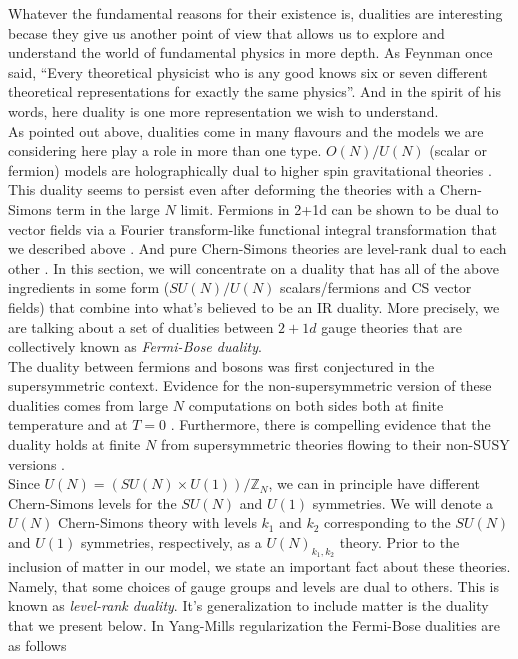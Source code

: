         Whatever the fundamental reasons for their existence is, dualities are interesting becase they give us another point of view that allows us to explore and understand the world of fundamental physics in more depth. As Feynman once said, ``Every theoretical physicist who is any good knows six or seven different theoretical representations for exactly the same physics''\cite{Feynman_quote}. And in the spirit of his words, here duality is one more representation we wish to understand.\\
        \indent As pointed out above, dualities come in many flavours and the models we are considering here play a role in more than one type. $O(N)/U(N)$ (scalar or fermion) models are holographically dual to higher spin gravitational theories \cite{hep-th/0210114}. This duality seems to persist even after deforming the theories with a Chern-Simons term in the large $N$ limit\cite{1110.4382}. Fermions in 2+1d can be shown to be dual to vector fields via a Fourier transform-like functional integral transformation that we described above \cite{hep-th/9401105, Barci1996}. And pure Chern-Simons theories are level-rank dual to each other \cite{Naculich1990, Camperi1990, Mlawer1991, Nakanishi1992, hep-th/0703089}. In this section, we will concentrate on a duality that has all of the above ingredients in some form ($SU(N)/U(N)$ scalars/fermions and CS vector fields) that combine into what's believed to be an IR duality. More precisely, we are talking about a set of dualities between $2+1d$ gauge theories that are collectively known as \textit{Fermi-Bose duality}.\\
        \indent The duality between fermions and bosons was first conjectured  in the supersymmetric context\cite{0808.0360, 1108.5373, 1305.3924, 1411.5475}. Evidence for the non-supersymmetric version of these dualities comes from large $N$ computations on both sides both at finite temperature \cite{1211.4843}  and at $T=0$ \cite{1110.4386}. Furthermore, there is compelling evidence that the duality holds at finite $N$ from supersymmetric theories flowing to their non-SUSY versions \cite{1305.7235, 1507.04378}.\\
        \indent Since $U(N) = (SU(N)\times U(1))/\mathbb{Z}_N$, we can in principle have different Chern-Simons levels for the $SU(N)$ and $U(1)$ symmetries. We will denote a $U(N)$ Chern-Simons theory with levels $k_1$ and $k_2$ corresponding to the $SU(N)$ and $U(1)$ symmetries, respectively, as a $U(N)_{k_1,k_2}$ theory. Prior to the inclusion of matter in our model, we state an important fact about these theories. Namely, that some choices of gauge groups and levels are dual to others. This is known as \textit{level-rank duality}. It's generalization to include matter is the duality that we present below. In Yang-Mills regularization the Fermi-Bose dualities are as follows \cite{1512.00161} \colorbox{red}{ }
